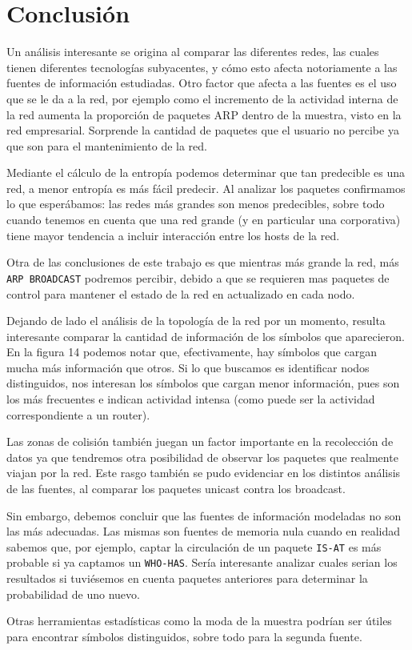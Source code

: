 \section{Conclusión}

Un análisis interesante se origina al comparar las diferentes redes, las cuales tienen diferentes tecnologías subyacentes, y cómo esto afecta notoriamente a las fuentes de información estudiadas. Otro factor que afecta a las fuentes es el uso que se le da a la red, por ejemplo como el incremento de la actividad interna de la red aumenta la proporción de paquetes ARP dentro de la muestra, visto en la red empresarial. Sorprende la cantidad de paquetes que el usuario no percibe ya que son para el mantenimiento de la red.

Mediante el cálculo de la entropía podemos determinar que tan predecible es una red, a menor entropía es más fácil predecir. Al analizar los paquetes confirmamos lo que esperábamos: las redes más grandes son menos predecibles, sobre todo cuando tenemos en cuenta que una red grande (y en particular una corporativa) tiene mayor tendencia a incluir interacción entre los hosts de la red.

Otra de las conclusiones de este trabajo es que mientras más grande la red, más \texttt{ARP BROADCAST} podremos percibir, debido a que se requieren mas paquetes de control para mantener el estado de la red en actualizado en cada nodo.

Dejando de lado el análisis de la topología de la red por un momento, resulta interesante comparar la cantidad de información de los símbolos que aparecieron. En la figura 14 podemos notar que, efectivamente, hay símbolos que cargan mucha más información que otros. Si lo que buscamos es identificar nodos distinguidos, nos interesan los símbolos que cargan menor información, pues son los más frecuentes e indican actividad intensa (como puede ser la actividad correspondiente a un router).

Las zonas de colisión también juegan un factor importante en la recolección de datos ya que tendremos otra posibilidad de observar los paquetes que realmente viajan por la red. Este rasgo también se pudo evidenciar en los distintos análisis de las fuentes, al comparar los paquetes unicast contra los broadcast.

Sin embargo, debemos concluir que las fuentes de información modeladas no son las más adecuadas. Las mismas son fuentes de memoria nula cuando en realidad sabemos que, por ejemplo, captar la circulación de un paquete \texttt{IS-AT} es más probable si ya captamos un \texttt{WHO-HAS}. Sería interesante analizar cuales serian los resultados si tuviésemos en cuenta paquetes anteriores para determinar la probabilidad de uno nuevo.

Otras herramientas estadísticas como la moda de la muestra podrían ser útiles para encontrar símbolos distinguidos, sobre todo para la segunda fuente.


